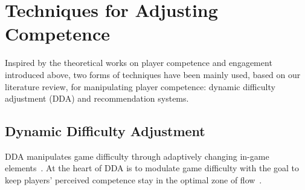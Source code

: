 




\section{Techniques for Adjusting Competence}

Inspired by the theoretical works on player competence and  engagement introduced above, two forms of techniques have been mainly used, based on our literature review, for manipulating player competence: dynamic difficulty adjustment (DDA) and recommendation systems.

\subsection{Dynamic Difficulty Adjustment}

DDA manipulates game difficulty through adaptively changing in-game elements~\cite{hunicke2005case}. At the heart of DDA is to modulate game difficulty with the goal to keep players' perceived competence stay in the optimal zone of flow~\cite{flow1990psychology,sweetser2005gameflow,chen2007flow}. 

